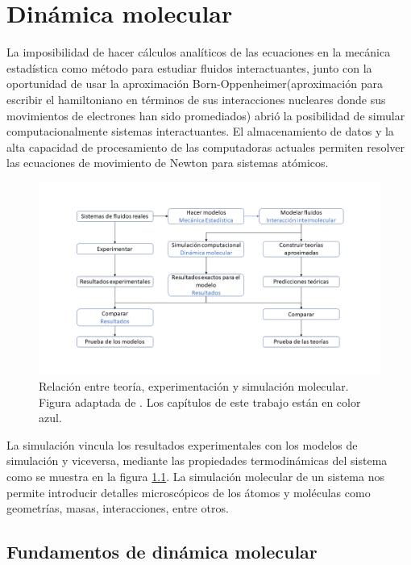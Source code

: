 
\chapter{Dinámica molecular}

La imposibilidad de hacer cálculos analíticos de las ecuaciones en la mecánica estadística como método para estudiar fluidos interactuantes, junto con la oportunidad de usar la aproximación Born-Oppenheimer(aproximación para escribir el hamiltoniano en términos de sus interacciones nucleares donde sus movimientos de electrones han sido promediados) abrió la posibilidad de simular computacionalmente sistemas interactuantes. El almacenamiento de datos y la alta capacidad de procesamiento de las computadoras actuales permiten resolver las ecuaciones de movimiento de Newton para sistemas atómicos.\\

\begin{figure}[!h]
    \centering
    \includegraphics[width=.8\textwidth,keepaspectratio=true]{MD/experimentsimulationtheoryfig.png}
    \caption{Relación entre teoría, experimentación y simulación molecular. Figura adaptada de \cite{Allen2017}. Los capítulos de este trabajo están en color azul.}
    \label{fig:conteexpsim}
\end{figure}

La simulación vincula los resultados experimentales con los modelos de simulación y viceversa, mediante las propiedades termodinámicas del sistema como se muestra en la figura \ref{fig:conteexpsim}. La simulación molecular de un sistema nos permite introducir detalles microscópicos de los átomos y moléculas como geometrías, masas, interacciones, entre otros.\\

\section{Fundamentos de dinámica molecular}


